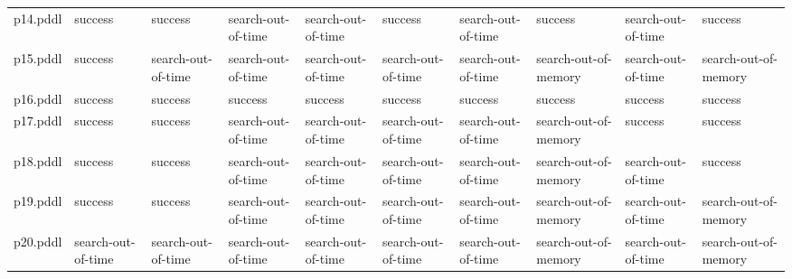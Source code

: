 \documentclass{article}
\begin{document}
\begin{tabular}{@{}lrrrrrrrrr@{}}
p14.pddl & \multicolumn{1}{|l|}{success} & \multicolumn{1}{|l|}{success} & \multicolumn{1}{|l|}{search-out-of-time} & \multicolumn{1}{|l|}{search-out-of-time} & \multicolumn{1}{|l|}{success} & \multicolumn{1}{|l|}{search-out-of-time} & \multicolumn{1}{|l|}{success} & \multicolumn{1}{|l|}{search-out-of-time} & \multicolumn{1}{|l|}{success} \\
p15.pddl & \multicolumn{1}{|l|}{success} & \multicolumn{1}{|l|}{search-out-of-time} & \multicolumn{1}{|l|}{search-out-of-time} & \multicolumn{1}{|l|}{search-out-of-time} & \multicolumn{1}{|l|}{search-out-of-time} & \multicolumn{1}{|l|}{search-out-of-time} & \multicolumn{1}{|l|}{search-out-of-memory} & \multicolumn{1}{|l|}{search-out-of-time} & \multicolumn{1}{|l|}{search-out-of-memory} \\
p16.pddl & \multicolumn{1}{|l|}{success} & \multicolumn{1}{|l|}{success} & \multicolumn{1}{|l|}{success} & \multicolumn{1}{|l|}{success} & \multicolumn{1}{|l|}{success} & \multicolumn{1}{|l|}{success} & \multicolumn{1}{|l|}{success} & \multicolumn{1}{|l|}{success} & \multicolumn{1}{|l|}{success} \\
p17.pddl & \multicolumn{1}{|l|}{success} & \multicolumn{1}{|l|}{success} & \multicolumn{1}{|l|}{search-out-of-time} & \multicolumn{1}{|l|}{search-out-of-time} & \multicolumn{1}{|l|}{search-out-of-time} & \multicolumn{1}{|l|}{search-out-of-time} & \multicolumn{1}{|l|}{search-out-of-memory} & \multicolumn{1}{|l|}{success} & \multicolumn{1}{|l|}{success} \\
p18.pddl & \multicolumn{1}{|l|}{success} & \multicolumn{1}{|l|}{success} & \multicolumn{1}{|l|}{search-out-of-time} & \multicolumn{1}{|l|}{search-out-of-time} & \multicolumn{1}{|l|}{search-out-of-time} & \multicolumn{1}{|l|}{search-out-of-time} & \multicolumn{1}{|l|}{search-out-of-memory} & \multicolumn{1}{|l|}{search-out-of-time} & \multicolumn{1}{|l|}{success} \\
p19.pddl & \multicolumn{1}{|l|}{success} & \multicolumn{1}{|l|}{success} & \multicolumn{1}{|l|}{search-out-of-time} & \multicolumn{1}{|l|}{search-out-of-time} & \multicolumn{1}{|l|}{search-out-of-time} & \multicolumn{1}{|l|}{search-out-of-time} & \multicolumn{1}{|l|}{search-out-of-memory} & \multicolumn{1}{|l|}{search-out-of-time} & \multicolumn{1}{|l|}{search-out-of-memory} \\
p20.pddl & \multicolumn{1}{|l|}{search-out-of-time} & \multicolumn{1}{|l|}{search-out-of-time} & \multicolumn{1}{|l|}{search-out-of-time} & \multicolumn{1}{|l|}{search-out-of-time} & \multicolumn{1}{|l|}{search-out-of-time} & \multicolumn{1}{|l|}{search-out-of-time} & \multicolumn{1}{|l|}{search-out-of-memory} & \multicolumn{1}{|l|}{search-out-of-time} & \multicolumn{1}{|l|}{search-out-of-memory} \\
\end{tabular}
\end{document}
